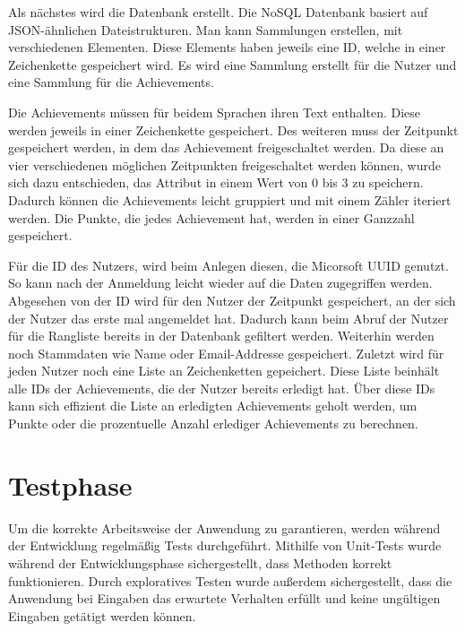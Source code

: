 \documentclass[12pt]{article}
\begin{document}
Als nächstes wird die Datenbank erstellt. Die NoSQL Datenbank basiert auf JSON-ähnlichen
Dateistrukturen. Man kann Sammlungen erstellen, mit verschiedenen Elementen. Diese Elements haben jeweils eine ID, welche
in einer Zeichenkette gespeichert wird. Es wird eine Sammlung erstellt für die Nutzer
und eine Sammlung für die Achievements. 

Die Achievements müssen für beidem Sprachen ihren Text enthalten. Diese werden jeweils in einer Zeichenkette gespeichert.
Des weiteren muss der Zeitpunkt gespeichert werden, in dem das Achievement freigeschaltet werden. Da diese an vier verschiedenen
möglichen Zeitpunkten freigeschaltet werden können, wurde sich dazu entschieden, das Attribut in einem Wert von 0 bis 3 zu speichern.
Dadurch können die Achievements leicht gruppiert und mit einem Zähler iteriert werden.
Die Punkte, die jedes Achievement hat, werden in einer Ganzzahl gespeichert.

Für die ID des Nutzers, wird beim Anlegen diesen, die Micorsoft UUID genutzt. So kann nach der Anmeldung leicht wieder auf die
Daten zugegriffen werden. Abgesehen von der ID wird für den Nutzer der Zeitpunkt gespeichert, an der sich der Nutzer das erste mal
angemeldet hat. Dadurch kann beim Abruf der Nutzer für die Rangliste bereits in der Datenbank gefiltert werden.
Weiterhin werden noch Stammdaten wie Name oder Email-Addresse gespeichert.
Zuletzt wird für jeden Nutzer noch eine Liste an Zeichenketten gepeichert. Diese Liste beinhält alle IDs der Achievements, die der
Nutzer bereits erledigt hat. Über diese IDs kann sich effizient die Liste an erledigten Achievements geholt werden, um Punkte oder
die prozentuelle Anzahl erlediger Achievements zu berechnen.


%
%

\section{Testphase}

Um die korrekte Arbeitsweise der Anwendung zu garantieren, werden während der Entwicklung regelmäßig Tests durchgeführt.
Mithilfe von Unit-Tests wurde während der Entwicklungsphase sichergestellt, dass Methoden korrekt funktionieren. Durch exploratives
Testen wurde außerdem sichergestellt, dass die Anwendung bei Eingaben das erwartete Verhalten erfüllt und keine ungültigen
Eingaben getätigt werden können.
\end{document}
